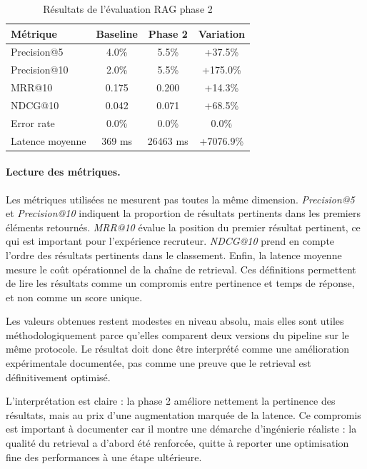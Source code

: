 \begin{table}[H]
  \centering
  \caption{Résultats de l'évaluation RAG phase 2}
  \begin{tabular}{lccc}
    \toprule
    Métrique & Baseline & Phase 2 & Variation \\
    \midrule
    Precision@5 & 4.0\% & 5.5\% & +37.5\% \\
    Precision@10 & 2.0\% & 5.5\% & +175.0\% \\
    MRR@10 & 0.175 & 0.200 & +14.3\% \\
    NDCG@10 & 0.042 & 0.071 & +68.5\% \\
    Error rate & 0.0\% & 0.0\% & 0.0\% \\
    Latence moyenne & 369 ms & 26463 ms & +7076.9\% \\
    \bottomrule
  \end{tabular}
\end{table}

\paragraph{Lecture des métriques.}
Les métriques utilisées ne mesurent pas toutes la même dimension. \textit{Precision@5} et \textit{Precision@10} indiquent la proportion de résultats pertinents dans les premiers éléments retournés. \textit{MRR@10} évalue la position du premier résultat pertinent, ce qui est important pour l'expérience recruteur. \textit{NDCG@10} prend en compte l'ordre des résultats pertinents dans le classement. Enfin, la latence moyenne mesure le coût opérationnel de la chaîne de retrieval. Ces définitions permettent de lire les résultats comme un compromis entre pertinence et temps de réponse, et non comme un score unique.

Les valeurs obtenues restent modestes en niveau absolu, mais elles sont utiles méthodologiquement parce qu'elles comparent deux versions du pipeline sur le même protocole. Le résultat doit donc être interprété comme une amélioration expérimentale documentée, pas comme une preuve que le retrieval est définitivement optimisé.

L'interprétation est claire : la phase 2 améliore nettement la pertinence des résultats, mais au prix d'une augmentation marquée de la latence. Ce compromis est important à documenter car il montre une démarche d'ingénierie réaliste : la qualité du retrieval a d'abord été renforcée, quitte à reporter une optimisation fine des performances à une étape ultérieure.

